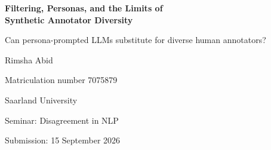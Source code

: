 \documentclass[11pt,a4paper]{article}
\begin{document}
\begin{titlepage}
\centering
\vspace*{4cm}

{\LARGE\bfseries Filtering, Personas, and the Limits of\\[0.3em]
Synthetic Annotator Diversity\par}

\vspace{1em}
{\large Can persona-prompted LLMs substitute for diverse human annotators?\par}

\vspace{3cm}
{\large Rimsha Abid\par}
\vspace{0.3em}
{Matriculation number 7075879\par}
\vspace{0.5em}
{\large Saarland University\par}

\vspace{2cm}
{Seminar: Disagreement in NLP\par}
\vspace{0.5em}
{Submission: 15 September 2026\par}

\vfill
\end{titlepage}
\end{document}
